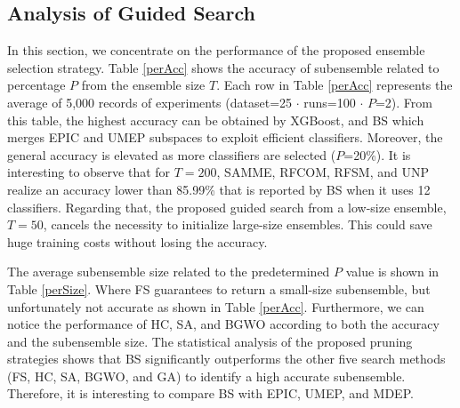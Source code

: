 
\subsection{Analysis of Guided Search} 
In this section, we concentrate on the performance of the proposed ensemble selection strategy. Table \ref{perAcc} shows the accuracy of subensemble related to percentage $P$ from the ensemble size $T$. Each row in Table \ref{perAcc} represents the average of 5,000 records of experiments (dataset=25 $\cdot$ runs=100 $\cdot$ $P$=2). From this table, the highest accuracy can be obtained by XGBoost, and  BS which merges EPIC and UMEP subspaces to exploit efficient classifiers. Moreover, the general accuracy is elevated as more classifiers are selected ($P$=20\%). It is interesting to observe that for $T=200$, SAMME, RFCOM, RFSM, and UNP realize an accuracy lower than 85.99\% that is reported by BS when it uses 12 classifiers. Regarding that, the proposed guided search from a low-size ensemble, $T=50$, cancels the necessity to initialize large-size ensembles. This could save huge training costs without losing the accuracy. 


The average subensemble size related to the predetermined $P$ value is shown in Table \ref{perSize}. Where FS guarantees to return a small-size subensemble, but unfortunately not accurate as shown in Table \ref{perAcc}. Furthermore, we can notice the performance of HC, SA, and BGWO according to both the accuracy and the subensemble size. The statistical analysis of the proposed pruning strategies shows that BS significantly outperforms the other five search methods (FS, HC, SA, BGWO, and GA) to identify a high accurate subensemble. Therefore, it is interesting to compare BS with EPIC, UMEP, and MDEP.
 
\vspace*{.3cm}






